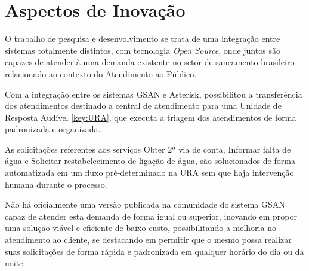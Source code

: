 \section*{Aspectos de Inovação}
O trabalho de pesquisa e desenvolvimento se trata de uma integração entre sistemas totalmente distintos, com tecnologia \textit{Open Source}, onde juntos são capazes de atender à uma demanda existente no setor de saneamento brasileiro relacionado ao contexto do Atendimento ao Público.

Com a integração entre os sistemas GSAN e Asterisk, possibilitou a transferência dos atendimentos destinado a central de atendimento para uma Unidade de Resposta Audível \ref{key:URA}, que executa a triagem dos atendimentos de forma padronizada e organizada.

As solicitações referentes aos serviços Obter 2ª via de conta, Informar falta de água e Solicitar restabelecimento de ligação de água, são solucionados de forma automatizada em um fluxo pré-determinado na URA sem que haja intervenção humana durante o processo. 

Não há oficialmente uma versão publicada na comunidade do sistema GSAN capaz de atender esta demanda de forma igual ou superior, inovando em propor uma solução viável e eficiente de baixo custo, possibilitando a melhoria no atendimento ao cliente, se destacando em permitir que o mesmo possa realizar suas solicitações de forma rápida e padronizada em qualquer horário do dia ou da noite.